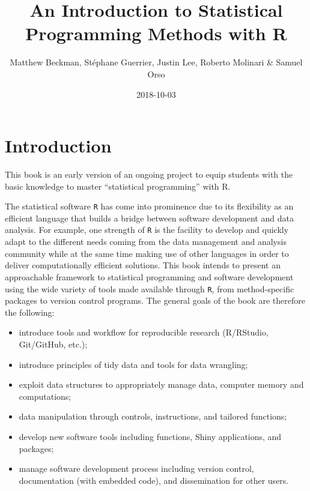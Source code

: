 \documentclass[12pt,]{krantz}
\title{An Introduction to Statistical Programming Methods with R}
\author{Matthew Beckman, Stéphane Guerrier, Justin Lee, Roberto Molinari \&
Samuel Orso}
\date{2018-10-03}
\providecommand{\tightlist}{%
  \setlength{\itemsep}{0pt}\setlength{\parskip}{0pt}}
\begin{document}
\maketitle

\thispagestyle{empty}

\setlength{\abovedisplayskip}{-5pt}
\setlength{\abovedisplayshortskip}{-5pt}

{
\hypersetup{linkcolor=black}
\setcounter{tocdepth}{1}
\tableofcontents
}
\listoftables
\listoffigures
\chapter{Introduction}\label{introduction}

This book is an early version of an ongoing project to equip students
with the basic knowledge to master ``statistical programming'' with R.

The statistical software \texttt{R} has come into prominence due to its
flexibility as an efficient language that builds a bridge between
software development and data analysis. For example, one strength of
\texttt{R} is the facility to develop and quickly adapt to the different
needs coming from the data management and analysis community while at
the same time making use of other languages in order to deliver
computationally efficient solutions. This book intends to present an
approachable framework to statistical programming and software
development using the wide variety of tools made available through
\texttt{R}, from method-specific packages to version control programs.
The general goals of the book are therefore the following:

\begin{itemize}
\tightlist
\item
  introduce tools and workflow for reproducible research (R/RStudio,
  Git/GitHub, etc.);
\item
  introduce principles of tidy data and tools for data wrangling;
\item
  exploit data structures to appropriately manage data, computer memory
  and computations;
\item
  data manipulation through controls, instructions, and tailored
  functions;
\item
  develop new software tools including functions, Shiny applications,
  and packages;
\item
  manage software development process including version control,
  documentation (with embedded code), and dissemination for other users.
\end{itemize}
\end{document}
